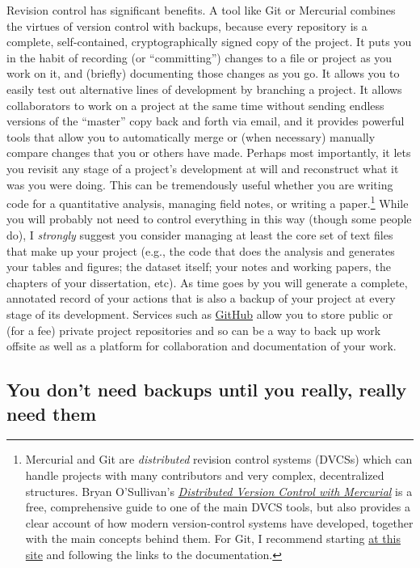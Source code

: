 \documentclass[11pt,article,oneside]{memoir}
\begin{document}
Revision control has significant benefits. A tool like Git or
Mercurial combines the virtues of version control with backups,
because every repository is a complete, self-contained,
cryptographically signed copy of the project. It puts you in the habit
of recording (or ``committing'') changes to a file or project as you
work on it, and (briefly) documenting those changes as you go. It
allows you to easily test out alternative lines of development by
branching a project. It allows collaborators to work on a project at
the same time without sending endless versions of the ``master'' copy
back and forth via email, and it provides powerful tools that allow
you to automatically merge or (when necessary) manually compare
changes that you or others have made. Perhaps most importantly, it
lets you revisit any stage of a project's development at will and
reconstruct what it was you were doing. This can be tremendously
useful whether you are writing code for a quantitative analysis,
managing field notes, or writing a paper.\footnote{Mercurial and Git
  are \emph{distributed} revision control systems (DVCSs) which can
  handle projects with many contributors and very complex,
  decentralized structures. Bryan O'Sullivan's
  \emph{\href{http://hgbook.red-bean.com/hgbook.pdf}{Distributed
      Version Control with Mercurial}} is a free, comprehensive guide
  to one of the main DVCS tools, but also provides a clear account of
  how modern version-control systems have developed, together with the
  main concepts behind them. For Git, I recommend starting
  \href{http://git-scm.com/}{at this site} and following the links to
  the documentation. } While you will probably not need to control
everything in this way (though some people do), I \emph{strongly}
suggest you consider managing at least the core set of text files that
make up your project (e.g., the code that does the analysis and
generates your tables and figures; the dataset itself; your notes and
working papers, the chapters of your dissertation, etc). As time goes
by you will generate a complete, annotated record of your actions that
is also a backup of your project at every stage of its
development. Services such as \href{http://www.github.com}{GitHub}
allow you to store public or (for a fee) private project repositories
and so can be a way to back up work offsite as well as a platform for
collaboration and documentation of your work.

\subsection*{You don't need backups until you really, really need them}
\label{sec-6_4}
\end{document}
